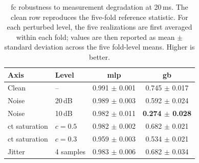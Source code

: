 \begin{table}[pos=ht]
\caption{\ac{fc} robustness to measurement degradation at 20\,ms. The clean row reproduces the five-fold reference statistic. For each perturbed level, the five realizations are first averaged within each fold; values are then reported as mean $\pm$ standard deviation across the five fold-level means. Higher is better.}
\label{tab:fidelity_fc}
\small
\centering
\begin{revblock}
\begin{tabular}{llcc}
\toprule
\textbf{Axis} & \textbf{Level} & \textbf{\ac{mlp}} & \textbf{\ac{gb}} \\
\midrule
Clean                 & --        & 0.991 $\pm$ 0.001 & 0.745 $\pm$ 0.017 \\
Noise                 & 20\,dB    & 0.989 $\pm$ 0.003 & 0.592 $\pm$ 0.024 \\
Noise                 & 10\,dB    & 0.982 $\pm$ 0.011 & \textbf{0.274 $\pm$ 0.028} \\
\ac{ct} saturation    & $c=0.5$   & 0.982 $\pm$ 0.002 & 0.682 $\pm$ 0.021 \\
\ac{ct} saturation    & $c=0.3$   & 0.959 $\pm$ 0.003 & 0.534 $\pm$ 0.021 \\
Jitter                & 4 samples & 0.983 $\pm$ 0.006 & 0.682 $\pm$ 0.034 \\
\bottomrule
\end{tabular}
\end{revblock}
\end{table}
